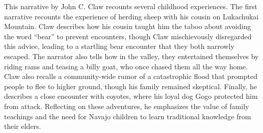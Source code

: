 This narrative by John C. Claw recounts several childhood experiences. The first narrative recounts the experience of herding sheep with his cousin on Lukachukai Mountain. Claw describes how his cousin taught him the taboo about avoiding the word ``bear'' to prevent encounters, though Claw mischievously disregarded this advice, leading to a startling bear encounter that they both narrowly escaped. The narrator also tells how in the valley, they entertained themselves by riding rams and teasing a billy goat, who once chased them all the way home. Claw also recalls a community-wide rumor of a catastrophic flood that prompted people to flee to higher ground, though his family remained skeptical. Finally, he describes a close encounter with coyotes, where his loyal dog Gogo protected him from attack. Reflecting on these adventures, he emphasizes the value of family teachings and the need for Navajo children to learn traditional knowledge from their elders.